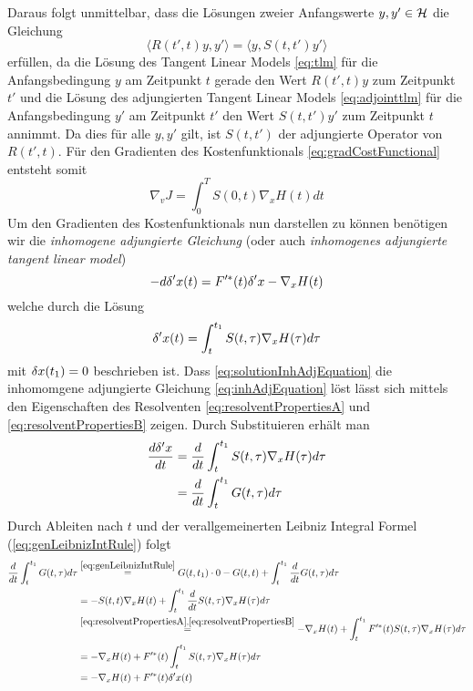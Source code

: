 Daraus folgt unmittelbar, dass die Lösungen zweier Anfangswerte $y,y' \in \mathcal{H}$ die Gleichung
\begin{equation*}
\langle R(t',t)y,y'\rangle = \langle y,S(t,t')y'\rangle 
\end{equation*}
erfüllen, da die Lösung des Tangent Linear Models \eqref{eq:tlm} für die Anfangsbedingung $y$ am Zeitpunkt $t$ gerade den Wert $R(t',t)y$ zum Zeitpunkt $t'$ und die Lösung des adjungierten Tangent Linear Models \eqref{eq:adjointtlm} für die Anfangsbedingung $y'$ am Zeitpunkt $t'$ den Wert $S(t,t')y'$ zum Zeitpunkt $t$ annimmt. Da dies für alle $y,y'$ gilt, ist $S(t,t')$ der adjungierte Operator von $R(t',t)$.
Für den Gradienten des Kostenfunktionals \eqref{eq:gradCostFunctional} entsteht somit
\begin{equation}
\label{eq:gradCostFunctionalAdjoint}
 \nabla_v J = \int_0^T S(0,t) \nabla_x H(t) dt
\end{equation}
Um den Gradienten des Kostenfunktionals nun darstellen zu können benötigen wir die \textit{inhomogene adjungierte Gleichung} (oder auch \textit{inhomogenes adjungierte tangent linear model})
\begin{equation}
\label{eq:inhAdjEquation}
-d\delta'x(t) = F'^*(t)\delta'x - \nabla_x H(t)
\end{equation}
welche durch die Lösung 
\begin{equation}
\label{eq:solutionInhAdjEquation}
 \delta'x(t) = \int_t^{t_1} S(t,\tau)\nabla_x H(\tau)d\tau
\end{equation}
mit $\delta x(t_1)=0$ beschrieben ist.
Dass \eqref{eq:solutionInhAdjEquation} die inhomomgene adjungierte Gleichung \eqref{eq:inhAdjEquation} löst lässt sich mittels den Eigenschaften des Resolventen \eqref{eq:resolventPropertiesA} und \eqref{eq:resolventPropertiesB} zeigen. Durch Substituieren erhält man
\begin{equation*}
 \begin{aligned}
  \frac{d\delta'x}{dt} &= \frac{d}{dt} \int_t^{t_1} S(t,\tau)\nabla_x H(\tau)d\tau \\
			 &= \frac{d}{dt} \int_t^{t_1} G(t,\tau)d\tau 
\end{aligned}
\end{equation*}
Durch Ableiten nach $t$ und der verallgemeinerten Leibniz Integral Formel (\ref{eq:genLeibnizIntRule}) folgt
\begin{equation*}
 \begin{aligned}
 \frac{d}{dt} \int_t^{t_1} G(t,\tau)d\tau  
			 &\overset{\eqref{eq:genLeibnizIntRule}}= G(t,t_1)\cdot 0 - G(t,t) + \int_t^{t_1} \frac{d}{dt}G(t,\tau) d\tau \\
			 &= -S(t,t)\nabla_x H(t) + \int_t^{t_1} \frac{d}{dt}S(t,\tau)\nabla_x H(\tau) d\tau \\
			 &\overset{\eqref{eq:resolventPropertiesA},\eqref{eq:resolventPropertiesB}}= -\nabla_x H(t) + \int_t^{t_1} F'^*(t)S(t,\tau)\nabla_x H(\tau) d\tau \\
			  &= -\nabla_x H(t) +F'^*(t) \int_t^{t_1} S(t,\tau)\nabla_x H(\tau) d\tau \\
			 &= -\nabla_x H(t) +F'^*(t) \delta 'x(t) \\
 \end{aligned}
\end{equation*}
